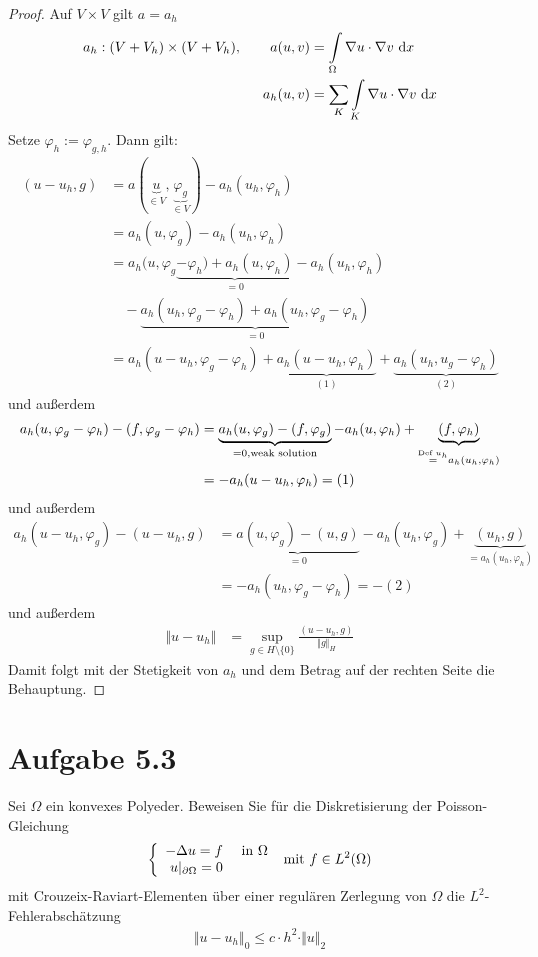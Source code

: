\documentclass[12pt,a4paper]{article}
\begin{document}
\begin{proof}
Auf $V\times V$ gilt $a=a_h$
\begin{align*}
a_h:(V+V_h)\times(V+V_h),\qquad
a(u,v)&=\int\limits_\Omega\nabla u\cdot\nabla v\d x\\
a_h(u,v)&=\sum\limits_{K}\int\limits_K\nabla u\cdot\nabla v\d x
\end{align*}
Setze $\varphi_h:=\varphi_{g,h}$. Dann gilt:
\begin{align*}
(u-u_h,g)&=a(\underbrace{u}_{\in V},\underbrace{\varphi_g}_{\in V})-a_h(u_h,\varphi_h)\\
&=a_h(u,\varphi_g)-a_h(u_h,\varphi_h)\\
&=a_h(u,\varphi_g\underbrace{-\varphi_h)+a_h(u,\varphi_h)}_{=0}-a_h(u_h,\varphi_h)\\
&{} \quad-\underbrace{a_h(u_h,\varphi_g-\varphi_h)+a_h(u_h,\varphi_g-\varphi_h)}_{=0}\\
&=a_h(u-u_h,\varphi_g-\varphi_h)+\underbrace{a_h(u-u_h,\varphi_h)}_{(1)}+\underbrace{a_h(u_h,u_g-\varphi_h)}_{(2)}
\end{align*}
und außerdem
\begin{align*}
a_h(u,\varphi_g-\varphi_h)-(f,\varphi_g-\varphi_h)
&=\underbrace{a_h(u,\varphi_g)-(f,\varphi_g)}_{=0, \text{weak solution}}-a_h(u,\varphi_h)+\underbrace{(f,\varphi_h)}_{\stackeq{\text{Def }u_h}a_h(u_h,\varphi_h)}\\
&=-a_h(u-u_h,\varphi_h) = (1)
\end{align*}
und außerdem %
\begin{align*}
a_h(u-u_h,\varphi_g)-(u-u_h,g)
&=\underbrace{a(u,\varphi_g)-(u,g)}_{=0}-a_h(u_h,\varphi_g)+\underbrace{(u_h,g)}_{=a_h(u_h,\varphi_h)}\\
&=-a_h(u_h,\varphi_g-\varphi_h) = -(2)
\end{align*}
und außerdem %
\begin{align*}
\Vert u-u_h\Vert
&=\sup\limits_{g\in H\setminus\lbrace0\rbrace}\frac{(u-u_h,g)}{\Vert g\Vert_H}
\end{align*}
Damit folgt mit der Stetigkeit von $a_h$ und dem Betrag auf der rechten Seite die Behauptung.
\end{proof}

\section*{Aufgabe 5.3}
Sei $\Omega$ ein konvexes Polyeder. Beweisen Sie für die Diskretisierung der Poisson-Gleichung
\begin{align*}
\left\lbrace\begin{array}{rl}
-\Delta u=f &\text{ in }\Omega\\
u|_{\partial\Omega}=0
\end{array}\right.\mit f\in L^2(\Omega)
\end{align*}
mit Crouzeix-Raviart-Elementen über einer regulären Zerlegung von $\Omega$ die $L^2$-Fehlerabschätzung
\begin{align*}
\Vert u-u_h\Vert_0\leq c\cdot h^2\cdot\Vert u\Vert_2
\end{align*}
\end{document}
